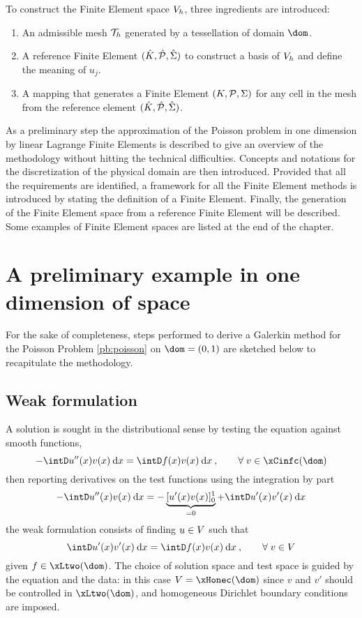 \medskip
To construct the Finite Element space ${{V}}_h$, three ingredients are introduced:
\begin{enumerate}
\item An admissible mesh ${\mathcal T}_h$ generated by a tessellation of domain $\dom$.
\item A reference Finite Element ${({\hat {{K}}},{\hat {{\mathcal P}}}, {\hat{{\Sigma}}})}$ to construct a basis of ${{V}}_h$ and define the meaning of $u_j$.
\item A mapping that generates a Finite Element ${({K},{\mathcal P}, {\Sigma})}$ for any cell in the mesh from the reference element ${({\hat {{K}}},{\hat {{\mathcal P}}}, {\hat{{\Sigma}}})}$.
\end{enumerate}

\medskip
As a preliminary step the approximation of the Poisson problem in one dimension by linear Lagrange Finite Elements is described to give an overview of the methodology without hitting the technical difficulties.
Concepts and notations for the discretization of the physical domain are then introduced.
Provided that all the requirements are identified, a framework for all the Finite Element methods is introduced by stating the definition of a Finite Element.
Finally, the generation of the Finite Element space from a reference Finite Element will be described.
Some examples of Finite Element spaces are listed at the end of the chapter.

\section{A preliminary example in one dimension of space}\label{sec:poisson_lagrange_p1}

For the sake of completeness, steps performed to derive a Galerkin method for the Poisson Problem \ref{pb:poisson} on $\dom = (0, 1)$ are sketched below to recapitulate the methodology.

\subsection{Weak formulation}

A solution is sought in the distributional sense by testing the equation against smooth functions,
\begin{equation*}
- \intD u''(x) v(x) \md x = \intD f(x) v(x) \md x\:,\qquad\forany v \in \xCinfc(\dom)
\end{equation*}
then reporting derivatives on the test functions using the integration by part
\begin{equation*}
- \intD u''(x) v(x) \md x = - \underbrace{[u'(x)v(x)]_0^1}_{= 0} + \intD u'(x) v'(x) \md x
\end{equation*}
the weak formulation consists of finding $u\in{V}$ such that
\begin{equation*}
\intD u'(x) v'(x) \md x = \intD f(x) v(x) \md x\:,\qquad\forany v \in \xV
\end{equation*}
given $f \in \xLtwo(\dom)$.
The choice of solution space and test space is guided by the equation and the data: in this case $\xV = \xHonec(\dom)$ since $v$ and $v'$ should be controlled in $\xLtwo(\dom)$, and homogeneous Dirichlet boundary conditions are imposed.

